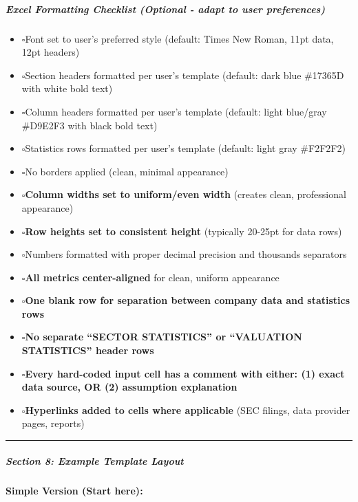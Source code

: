\documentclass[11pt]{article}
\newcommand{\UncheckedBox}{$\square$}
\begin{document}
\subparagraph{Excel Formatting Checklist (Optional - adapt to user preferences)}\mbox{}\par
\begin{itemize}[leftmargin=*,itemsep=2pt,topsep=2pt]
\item {} \UncheckedBox Font set to user's preferred style (default: Times New Roman, 11pt data, 12pt headers)
\item {} \UncheckedBox Section headers formatted per user's template (default: dark blue \#17365D with white bold text)
\item {} \UncheckedBox Column headers formatted per user's template (default: light blue/gray \#D9E2F3 with black bold text)
\item {} \UncheckedBox Statistics rows formatted per user's template (default: light gray \#F2F2F2)
\item {} \UncheckedBox No borders applied (clean, minimal appearance)
\item {} \UncheckedBox \textbf{Column widths set to uniform/even width} (creates clean, professional appearance)
\item {} \UncheckedBox \textbf{Row heights set to consistent height} (typically 20-25pt for data rows)
\item {} \UncheckedBox Numbers formatted with proper decimal precision and thousands separators
\item {} \UncheckedBox \textbf{All metrics center-aligned} for clean, uniform appearance
\item {} \UncheckedBox \textbf{One blank row for separation between company data and statistics rows}
\item {} \UncheckedBox \textbf{No separate ``SECTOR STATISTICS'' or ``VALUATION STATISTICS'' header rows}
\item {} \UncheckedBox \textbf{Every hard-coded input cell has a comment with either: (1) exact data source, OR (2) assumption explanation}
\item {} \UncheckedBox \textbf{Hyperlinks added to cells where applicable} (SEC filings, data provider pages, reports)
\end{itemize}

\vspace{0.5em}\hrule\vspace{0.5em}

\subparagraph{Section 8: Example Template Layout}\mbox{}\par

\textbf{Simple Version (Start here):}
\end{document}
